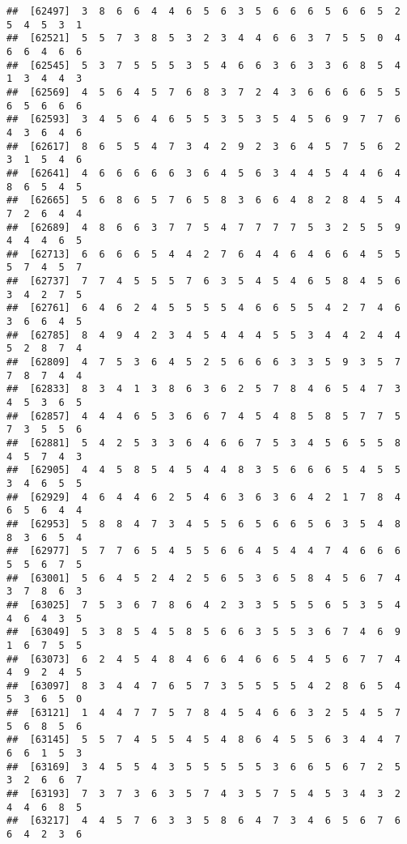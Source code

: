 \documentclass[
]{book}
\begin{document}
\begin{verbatim}
##  [62497]  3  8  6  6  4  4  6  5  6  3  5  6  6  6  5  6  6  5  2  5  4  5  3  1
##  [62521]  5  5  7  3  8  5  3  2  3  4  4  6  6  3  7  5  5  0  4  6  6  4  6  6
##  [62545]  5  3  7  5  5  5  3  5  4  6  6  3  6  3  3  6  8  5  4  1  3  4  4  3
##  [62569]  4  5  6  4  5  7  6  8  3  7  2  4  3  6  6  6  6  5  5  6  5  6  6  6
##  [62593]  3  4  5  6  4  6  5  5  3  5  3  5  4  5  6  9  7  7  6  4  3  6  4  6
##  [62617]  8  6  5  5  4  7  3  4  2  9  2  3  6  4  5  7  5  6  2  3  1  5  4  6
##  [62641]  4  6  6  6  6  6  3  6  4  5  6  3  4  4  5  4  4  6  4  8  6  5  4  5
##  [62665]  5  6  8  6  5  7  6  5  8  3  6  6  4  8  2  8  4  5  4  7  2  6  4  4
##  [62689]  4  8  6  6  3  7  7  5  4  7  7  7  7  5  3  2  5  5  9  4  4  4  6  5
##  [62713]  6  6  6  6  5  4  4  2  7  6  4  4  6  4  6  6  4  5  5  5  7  4  5  7
##  [62737]  7  7  4  5  5  5  7  6  3  5  4  5  4  6  5  8  4  5  6  3  4  2  7  5
##  [62761]  6  4  6  2  4  5  5  5  5  4  6  6  5  5  4  2  7  4  6  3  6  6  4  5
##  [62785]  8  4  9  4  2  3  4  5  4  4  4  5  5  3  4  4  2  4  4  5  2  8  7  4
##  [62809]  4  7  5  3  6  4  5  2  5  6  6  6  3  3  5  9  3  5  7  7  8  7  4  4
##  [62833]  8  3  4  1  3  8  6  3  6  2  5  7  8  4  6  5  4  7  3  4  5  3  6  5
##  [62857]  4  4  4  6  5  3  6  6  7  4  5  4  8  5  8  5  7  7  5  7  3  5  5  6
##  [62881]  5  4  2  5  3  3  6  4  6  6  7  5  3  4  5  6  5  5  8  4  5  7  4  3
##  [62905]  4  4  5  8  5  4  5  4  4  8  3  5  6  6  6  5  4  5  5  3  4  6  5  5
##  [62929]  4  6  4  4  6  2  5  4  6  3  6  3  6  4  2  1  7  8  4  6  5  6  4  4
##  [62953]  5  8  8  4  7  3  4  5  5  6  5  6  6  5  6  3  5  4  8  8  3  6  5  4
##  [62977]  5  7  7  6  5  4  5  5  6  6  4  5  4  4  7  4  6  6  6  5  5  6  7  5
##  [63001]  5  6  4  5  2  4  2  5  6  5  3  6  5  8  4  5  6  7  4  3  7  8  6  3
##  [63025]  7  5  3  6  7  8  6  4  2  3  3  5  5  5  6  5  3  5  4  4  6  4  3  5
##  [63049]  5  3  8  5  4  5  8  5  6  6  3  5  5  3  6  7  4  6  9  1  6  7  5  5
##  [63073]  6  2  4  5  4  8  4  6  6  4  6  6  5  4  5  6  7  7  4  4  9  2  4  5
##  [63097]  8  3  4  4  7  6  5  7  3  5  5  5  5  4  2  8  6  5  4  5  3  6  5  0
##  [63121]  1  4  4  7  7  5  7  8  4  5  4  6  6  3  2  5  4  5  7  5  6  8  5  6
##  [63145]  5  5  7  4  5  5  4  5  4  8  6  4  5  5  6  3  4  4  7  6  6  1  5  3
##  [63169]  3  4  5  5  4  3  5  5  5  5  5  3  6  6  5  6  7  2  5  3  2  6  6  7
##  [63193]  7  3  7  3  6  3  5  7  4  3  5  7  5  4  5  3  4  3  2  4  4  6  8  5
##  [63217]  4  4  5  7  6  3  3  5  8  6  4  7  3  4  6  5  6  7  6  6  4  2  3  6

\end{verbatim}
\end{document}

